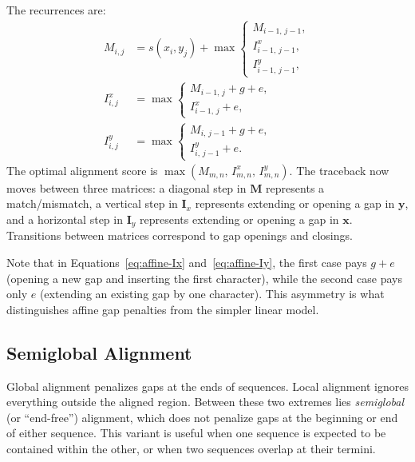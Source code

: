 The recurrences are:
\begin{align}
  \label{eq:affine-M}
  M_{i,j} &= s(x_i, y_j) + \max \begin{cases}
    M_{i-1,\,j-1}, \\
    I^x_{i-1,\,j-1}, \\
    I^y_{i-1,\,j-1},
  \end{cases} \\[6pt]
  \label{eq:affine-Ix}
  I^x_{i,j} &= \max \begin{cases}
    M_{i-1,\,j} + g + e, \\
    I^x_{i-1,\,j} + e,
  \end{cases} \\[6pt]
  \label{eq:affine-Iy}
  I^y_{i,j} &= \max \begin{cases}
    M_{i,\,j-1} + g + e, \\
    I^y_{i,\,j-1} + e.
  \end{cases}
\end{align}
The optimal alignment score is $\max(M_{m,n},\, I^x_{m,n},\, I^y_{m,n})$. The traceback now moves between three matrices: a diagonal step in $\mathbf{M}$ represents a match/mismatch, a vertical step in $\mathbf{I}_x$ represents extending or opening a gap in $\mathbf{y}$, and a horizontal step in $\mathbf{I}_y$ represents extending or opening a gap in $\mathbf{x}$. Transitions between matrices correspond to gap openings and closings.

Note that in Equations~\eqref{eq:affine-Ix} and~\eqref{eq:affine-Iy}, the first case pays $g + e$ (opening a new gap and inserting the first character), while the second case pays only $e$ (extending an existing gap by one character). This asymmetry is what distinguishes affine gap penalties from the simpler linear model.


\subsection{Semiglobal Alignment}
\label{sec:semiglobal}

Global alignment penalizes gaps at the ends of sequences. Local alignment ignores everything outside the aligned region. Between these two extremes lies \emph{semiglobal} (or ``end-free'') alignment, which does not penalize gaps at the beginning or end of either sequence. This variant is useful when one sequence is expected to be contained within the other, or when two sequences overlap at their termini.

